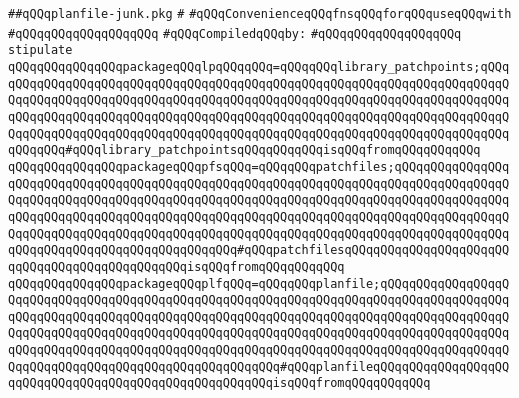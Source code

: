 \label{src/lib/make-library-glue/planfile-junk.pkg}
\verb|##qQQqplanfile-junk.pkg|\newline
\verb|#|\newline
\verb|#qQQqConvenienceqQQqfnsqQQqforqQQquseqQQqwith|\newline
\verb|#qQQqqQQqqQQqqQQqqQQq|\newline
\newline
\verb|#qQQqCompiledqQQqby:|\newline
\verb|#qQQqqQQqqQQqqQQqqQQq|\newline
\newline
\verb|stipulate|\newline
\verb|qQQqqQQqqQQqqQQqpackageqQQqlpqQQqqQQq=qQQqqQQqlibrary_patchpoints;qQQqqQQqqQQqqQQqqQQqqQQqqQQqqQQqqQQqqQQqqQQqqQQqqQQqqQQqqQQqqQQqqQQqqQQqqQQqqQQqqQQqqQQqqQQqqQQqqQQqqQQqqQQqqQQqqQQqqQQqqQQqqQQqqQQqqQQqqQQqqQQqqQQqqQQqqQQqqQQqqQQqqQQqqQQqqQQqqQQqqQQqqQQqqQQqqQQqqQQqqQQqqQQqqQQqqQQqqQQqqQQqqQQqqQQqqQQqqQQqqQQqqQQqqQQqqQQqqQQqqQQqqQQqqQQqqQQqqQQqqQQqqQQqqQQq#qQQqlibrary_patchpointsqQQqqQQqqQQqisqQQqfromqQQqqQQqqQQq|\newline
\verb|qQQqqQQqqQQqqQQqpackageqQQqpfsqQQq=qQQqqQQqpatchfiles;qQQqqQQqqQQqqQQqqQQqqQQqqQQqqQQqqQQqqQQqqQQqqQQqqQQqqQQqqQQqqQQqqQQqqQQqqQQqqQQqqQQqqQQqqQQqqQQqqQQqqQQqqQQqqQQqqQQqqQQqqQQqqQQqqQQqqQQqqQQqqQQqqQQqqQQqqQQqqQQqqQQqqQQqqQQqqQQqqQQqqQQqqQQqqQQqqQQqqQQqqQQqqQQqqQQqqQQqqQQqqQQqqQQqqQQqqQQqqQQqqQQqqQQqqQQqqQQqqQQqqQQqqQQqqQQqqQQqqQQqqQQqqQQqqQQqqQQqqQQqqQQqqQQqqQQqqQQqqQQqqQQqqQQq#qQQqpatchfilesqQQqqQQqqQQqqQQqqQQqqQQqqQQqqQQqqQQqqQQqqQQqqQQqisqQQqfromqQQqqQQqqQQq|\newline
\verb|qQQqqQQqqQQqqQQqpackageqQQqplfqQQq=qQQqqQQqplanfile;qQQqqQQqqQQqqQQqqQQqqQQqqQQqqQQqqQQqqQQqqQQqqQQqqQQqqQQqqQQqqQQqqQQqqQQqqQQqqQQqqQQqqQQqqQQqqQQqqQQqqQQqqQQqqQQqqQQqqQQqqQQqqQQqqQQqqQQqqQQqqQQqqQQqqQQqqQQqqQQqqQQqqQQqqQQqqQQqqQQqqQQqqQQqqQQqqQQqqQQqqQQqqQQqqQQqqQQqqQQqqQQqqQQqqQQqqQQqqQQqqQQqqQQqqQQqqQQqqQQqqQQqqQQqqQQqqQQqqQQqqQQqqQQqqQQqqQQqqQQqqQQqqQQqqQQqqQQqqQQqqQQqqQQqqQQqqQQq#qQQqplanfileqQQqqQQqqQQqqQQqqQQqqQQqqQQqqQQqqQQqqQQqqQQqqQQqqQQqqQQqisqQQqfromqQQqqQQqqQQq|\newline
